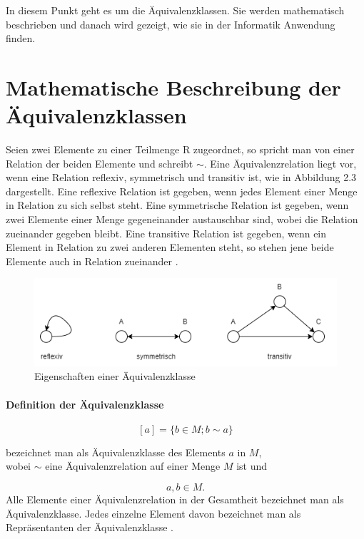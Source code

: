 In diesem Punkt geht es um die Äquivalenzklassen. Sie werden mathematisch beschrieben und danach wird gezeigt, wie sie
in der Informatik Anwendung finden.
\section*{Mathematische Beschreibung der Äquivalenzklassen}
Seien zwei Elemente zu einer Teilmenge R zugeordnet, so spricht man von einer Relation der beiden Elemente und schreibt $\sim$. 
Eine Äquivalenzrelation liegt vor, wenn eine Relation reflexiv, symmetrisch und 
transitiv ist, wie in Abbildung 2.3 dargestellt.
Eine reflexive Relation ist gegeben, wenn jedes Element einer Menge in Relation zu sich selbst steht. %
Eine symmetrische Relation ist gegeben, wenn zwei Elemente einer Menge gegeneinander austauschbar sind, wobei die Relation zueinander gegeben bleibt.
Eine transitive Relation ist gegeben, wenn ein Element in Relation zu zwei anderen Elementen steht, so stehen jene beide Elemente auch in Relation zueinander \cite[vgl.][S. 66]{equimaths}.
\begin{figure}[!h]
\centering
\includegraphics[scale=.9,]{Bilder/EquiDrawio/EigenschaftenEqui.drawio.png}
\caption{Eigenschaften einer Äquivalenzklasse \cite{eigequi1}\cite{eigequi2}}
\end{figure}
\newpage
\paragraph{Definition der Äquivalenzklasse}
$$[a] = \{b \in M ; b \sim a\}$$
\begin{center}
bezeichnet man als Äquivalenzklasse des Elements $a$ in $M$,\\
wobei $\sim$ eine Äquivalenzrelation auf einer Menge $M$ ist und\\
\end{center}
$$a,b \in M.$$
Alle Elemente einer Äquivalenzrelation in der Gesamtheit bezeichnet man als Äquivalenzklasse.
Jedes einzelne Element davon bezeichnet man als Repräsentanten der Äquivalenzklasse \cite[vgl.][S. 66]{equimaths}.

